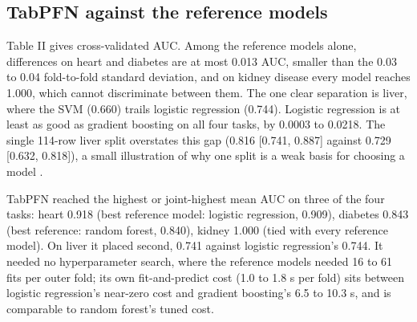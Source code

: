 \documentclass[conference]{IEEEtran}
\begin{document}
\subsection{TabPFN against the reference models}

Table II gives cross-validated AUC. Among the reference models alone, differences on heart and diabetes are at most 0.013 AUC, smaller than the 0.03 to 0.04 fold-to-fold standard deviation, and on kidney disease every model reaches 1.000, which cannot discriminate between them. The one clear separation is liver, where the SVM (0.660) trails logistic regression (0.744). Logistic regression is at least as good as gradient boosting on all four tasks, by 0.0003 to 0.0218. The single 114-row liver split overstates this gap (0.816 [0.741, 0.887] against 0.729 [0.632, 0.818]), a small illustration of why one split is a weak basis for choosing a model \cite{varoquaux2018}.

TabPFN reached the highest or joint-highest mean AUC on three of the four tasks: heart 0.918 (best reference model: logistic regression, 0.909), diabetes 0.843 (best reference: random forest, 0.840), kidney 1.000 (tied with every reference model). On liver it placed second, 0.741 against logistic regression's 0.744. It needed no hyperparameter search, where the reference models needed 16 to 61 fits per outer fold; its own fit-and-predict cost (1.0 to 1.8 s per fold) sits between logistic regression's near-zero cost and gradient boosting's 6.5 to 10.3 s, and is comparable to random forest's tuned cost.

\begin{table}[!t]
\caption{Cross-validated ROC-AUC (5 folds $\times$ 3 repeats) and wall-clock seconds per outer fold, including the reference models' inner tuning; TabPFN gets no search. CPU.}
\label{tab:models}
\centering\footnotesize
{}
\end{table}
\end{document}
